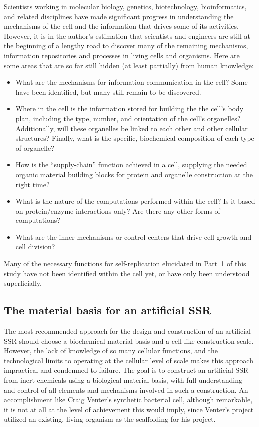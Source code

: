 Scientists working in molecular biology, genetics, biotechnology,
bioinformatics, and related disciplines have made significant progress
in understanding the mechanisms of the cell and the information that
drives some of its activities. However, it is in the author's estimation
that scientists and engineers are still
at the beginning of a lengthy road to discover many of the remaining
mechanisms, information repositories and processes in living cells and
organisms. Here are some areas that are so far still hidden (at least
partially) from human knowledge:

\begin{itemize}
\item What are the mechanisms for information communication in the cell?  Some have been identified, but many still remain to be discovered.
\item Where in the cell is the information 
stored for building the  the cell's body plan, including the type, number, and orientation of the cell's organelles?  Additionally, will these organelles be linked to each other and other cellular structures? Finally, what is the specific, biochemical composition of each type of organelle?
\item How is the “supply-chain” function achieved in a cell, supplying the needed organic material building blocks for
protein and organelle construction at the right time?
\item What is the nature of the computations performed within the cell? Is
it based on protein/enzyme interactions only? Are there any other
forms of computations?
\item What are the inner mechanisms or control centers that drive cell
growth and cell division?
\end{itemize}

Many of the necessary functions for self-replication
elucidated in Part~1 of this study have not been identified within
the cell yet, or have only been understood superficially.

\subsection{The material basis for an artificial SSR}

The most recommended approach for the design and construction of an
artificial SSR should choose a biochemical material basis and a
cell-like construction scale. However, the lack of knowledge of so many
cellular functions, and the technological limits to
operating at the cellular level of scale makes this approach
impractical and condemned to failure. The goal is to construct
an artificial SSR from inert chemicals
using a biological material basis, with full understanding and control
of all elements and mechanisms involved in such a construction. An
accomplishment like Craig Venter’s synthetic bacterial cell, although
remarkable, it is not at all at the level of achievement this would
imply, since Venter's project utilized an existing, living organism
as the scaffolding for his project.

